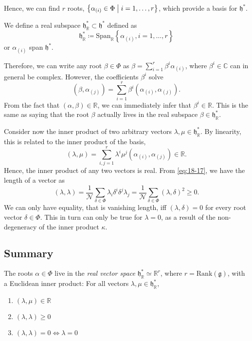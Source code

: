 Hence, we can find $r$ roots, $\left\{ \alpha_{(i)} \in \Phi \suchthat i = 1, \dots, r \right\}$, which provide a basis for $\mathfrak{h}^*$.
\begin{definition}[]
  We define a real subspace $\mathfrak{h}^*_{\mathbb{R}} \subset \mathfrak{h}^*$ defined as
  \begin{equation}
    \mathfrak{h}^*_{\mathbb{R}} \coloneqq \text{Span}_{\mathbb{R}}\left\{ \alpha_{(i)}, i = 1, \dots, r\right\}
  \end{equation}
  or $\alpha_{(i)}$ span $\mathfrak{h}^*$.
\end{definition}
Therefore, we can write any root $\beta \in \Phi$ as $\beta = \sum_{i=1}^{r} \beta^{i} \alpha_{(i)}$, where $\beta^{i} \in \mathbb{C}$ can in general be complex.
However, the coefficients $\beta^i $ solve
\begin{equation}
  (\beta, \alpha_{(j)}) = \sum_{i=1}^{r} \beta^i (\alpha_{(i)}, \alpha_{(j)}).
\end{equation}
From the fact that $(\alpha, \beta) \in \mathbb{R}$, we can immediately infer that $\beta^i \in \mathbb{R}$.
This is the same as saying that the root $\beta$ actually lives in the real subspace $\beta \in \mathfrak{h}^*_{\mathbb{R}}$.

Consider now the inner product of two arbitrary vectors $\lambda, \mu \in \mathfrak{h}^*_{\mathbb{R}}$.
By linearity, this is related to the inner product of the basis,
\begin{equation}
  (\lambda ,\mu) = \sum_{i, j =1}^{r} \lambda^{i} \mu^{j} (\alpha_{(i)}, \alpha_{(j)}) \in \mathbb{R}.
\end{equation}
Hence, the inner product of any two vectors is real.
From \eqref{eq:18-17}, we have the length of a vector as
\begin{equation}
  (\lambda, \lambda) = \frac{1}{\mathcal{N}} \sum_{\delta \in \Phi} \lambda_{i} \delta^{i} \delta^{j} \lambda_{j} = \frac{1}{\mathcal{N}} \sum_{\delta \in \Phi} (\lambda, \delta)^2 \geq 0.
\end{equation}
We can only have equality, that is vanishing length, iff $(\lambda, \delta) = 0$ for every root vector $\delta \in \Phi$. This in turn can only be true for  $\lambda = 0$, as a result of the non-degeneracy of the inner product $\kappa$. 

\subsection*{Summary}%

The roots $\alpha \in \Phi$ live in the \emph{real vector space} $\mathfrak{h}^*_{\mathbb{R}} \simeq \mathbb{R}^r$, where $r = \text{Rank}(\mathfrak{g})$, with a Euclidean inner product:
For all vectors $\lambda, \mu \in \mathfrak{h}^*_{\mathbb{R}}$, 
\begin{enumerate}
  \item $(\lambda, \mu) \in \mathbb{R}$ 
  \item $(\lambda, \lambda) \geq 0$ 
  \item $(\lambda,  \lambda) = 0 \iff \lambda = 0$
\end{enumerate}

